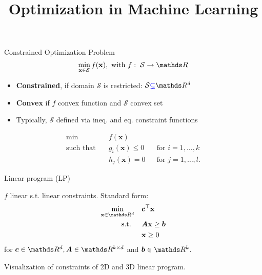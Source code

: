 \documentclass[11pt,compress,t,notes=noshow, xcolor=table]{beamer}
\title{Optimization in Machine Learning}
\begin{document}


\begin{frame2}{Constrained Optimization Problem}
$$
\min_{\xv \in \mathcal{S}} \fx, \text{ with } f: \; \mathcal{S} \to \R
$$
\begin{itemize}
\item \textbf{Constrained}, if domain $\mathcal{S}$ is restricted: $\mathcal{S} \textcolor{blue}{\subsetneq} \R^d$
\item \textbf{Convex} if $f$ convex function and $\mathcal{S}$ convex set
\item Typically, $\mathcal{S}$ defined via ineq. and eq. constraint functions
\end{itemize}
\spacer
$$
\begin{aligned}
\min \quad & f(\mathbf{x})  \\
\text{such that} \quad & g_i(\mathbf{x}) \le 0 && \text{for } i=1,\ldots,k \\
& h_j(\mathbf{x}) = 0 && \text{for } j=1,\ldots,l.
\end{aligned}
$$
\end{frame2}

\begin{framei}{Linear program (LP)}
\item $f$ linear s.t. linear constraints. Standard form:
$$
\begin{aligned}
\min_{\xv \in \R^d} \quad & \bm{c}^\top \xv \\
\text{s.t. } \quad & \bm{A}\xv \ge \bm{b} \\
& \xv \ge 0
\end{aligned}
$$
for $\bm{c}\in \R^d, \bm{A} \in \R^{k \times d}$ and $\bm{b} \in \R^k$.
\begin{center}\begin{footnotesize}
Visualization of constraints of 2D and 3D linear program.
\end{footnotesize}\end{center}
\end{framei}
\end{document}
